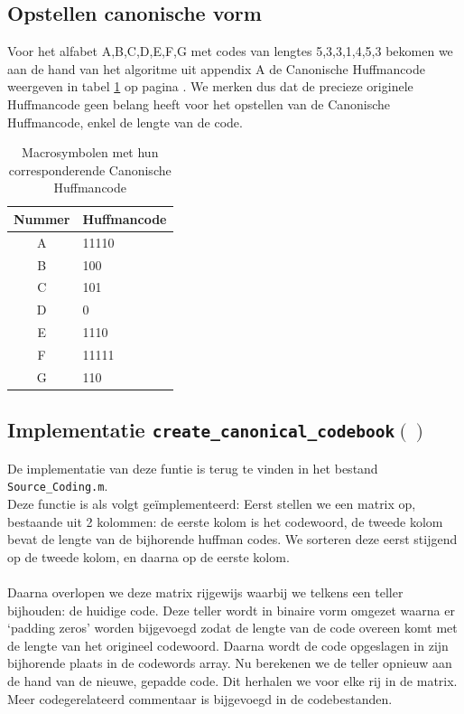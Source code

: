 \documentclass[11pt,a4paper]{article}
\begin{document}
\subsection{Opstellen canonische vorm}

Voor het alfabet {A,B,C,D,E,F,G} met codes van lengtes {5,3,3,1,4,5,3} bekomen we aan de hand van het algoritme uit appendix A de Canonische Huffmancode weergeven in tabel \ref{tab:1.4} op pagina \pageref{tab:1.4}. We merken dus dat de precieze originele Huffmancode geen belang heeft voor het opstellen van de Canonische Huffmancode, enkel de lengte van de code.

\begin{table}
\centering
\begin{tabular}{c|l}
Nummer & Huffmancode \\
\hline
A & 11110\\
\hline
B & 100\\
\hline
C & 101\\
\hline
D & 0\\
\hline
E & 1110\\
\hline
F & 11111\\
\hline
G & 110\\
\end{tabular} 
\caption{Macrosymbolen met hun corresponderende Canonische Huffmancode}
\label{tab:1.4}
\end{table}

\subsection{Implementatie \texttt{create\_canonical\_codebook$\left(\right)$}}

De implementatie van deze funtie is terug te vinden in het bestand \texttt{Source\_Coding.m}. \\
Deze functie is als volgt ge\"implementeerd: Eerst stellen we een matrix op, bestaande uit 2 kolommen: de eerste kolom is het codewoord, de tweede kolom bevat de lengte van de bijhorende huffman codes. We sorteren deze eerst stijgend op de tweede kolom, en daarna op de eerste kolom.\\\\
Daarna overlopen we deze matrix rijgewijs waarbij we telkens een teller bijhouden: de huidige code. Deze teller wordt in binaire vorm omgezet waarna er `padding zeros' worden bijgevoegd zodat de lengte van de code overeen komt met de lengte van het origineel codewoord. Daarna wordt de code opgeslagen in zijn bijhorende plaats in de codewords array. Nu berekenen we de teller opnieuw aan de hand van de nieuwe, gepadde code. Dit herhalen we voor elke rij in de matrix.\\
Meer codegerelateerd commentaar is bijgevoegd in de codebestanden.
\end{document}
